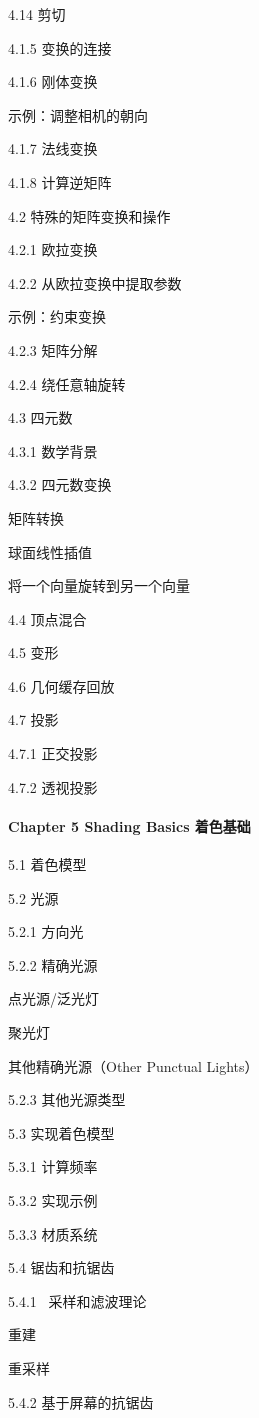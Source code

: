 \documentclass[
  paper=a4,
  ,captions=tableheading
]{scrartcl}
\begin{document}
4.14 剪切

4.1.5 变换的连接

4.1.6 刚体变换

示例：调整相机的朝向

4.1.7 法线变换

4.1.8 计算逆矩阵

4.2 特殊的矩阵变换和操作

4.2.1 欧拉变换

4.2.2 从欧拉变换中提取参数

示例：约束变换

4.2.3 矩阵分解

4.2.4 绕任意轴旋转

4.3 四元数

4.3.1 数学背景

4.3.2 四元数变换

矩阵转换

球面线性插值

将一个向量旋转到另一个向量

4.4 顶点混合

4.5 变形

4.6 几何缓存回放

4.7 投影

4.7.1 正交投影

4.7.2 透视投影

\paragraph{Chapter 5 Shading Basics
着色基础}\label{chapter-5-shading-basics-ux7740ux8272ux57faux7840}

5.1 着色模型

5.2 光源

5.2.1 方向光

5.2.2 精确光源

点光源/泛光灯

聚光灯

其他精确光源（Other Punctual Lights）

5.2.3 其他光源类型

5.3 实现着色模型

5.3.1 计算频率

5.3.2 实现示例

5.3.3 材质系统

5.4 锯齿和抗锯齿

5.4.1 ~采样和滤波理论

重建

重采样

5.4.2 基于屏幕的抗锯齿
\end{document}
